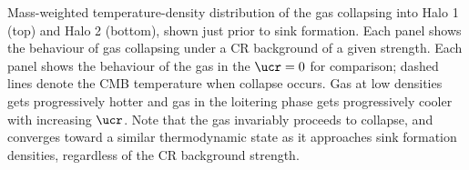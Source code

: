 \label{fig:temp}
Mass-weighted temperature-density distribution of the gas collapsing into Halo 1 (top) and Halo 2 (bottom), shown just prior to sink formation. Each panel shows the behaviour of gas collapsing under a CR background of a given strength. Each panel shows the behaviour of the gas in the $\ucr=0$ for comparison; dashed lines denote the CMB temperature when collapse occurs. Gas at low densities gets progressively hotter and gas in the loitering phase gets progressively cooler with increasing $\ucr$. Note that the gas invariably proceeds to collapse, and converges toward a similar thermodynamic state as it approaches sink formation densities, regardless of the CR background strength.
